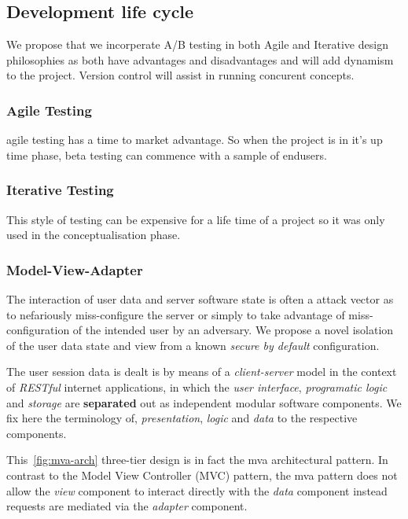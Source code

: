 \documentclass[letterpaper,12pt]{article}
\begin{document}
\subsection{Development life cycle}

We propose that we incorperate A/B testing in both Agile and Iterative design philosophies as both have advantages and disadvantages and will add dynamism to the project. Version control will assist in running concurent concepts. 

\subsubsection{Agile Testing}

\Gls{agile} testing has a time to market advantage. So when the project is in it's up time phase, beta testing can commence with a sample of endusers.

\subsubsection{Iterative Testing}

This style of testing can be expensive for a life time of a project so it was only used in the conceptualisation phase.

\subsubsection{Model-View-Adapter}

The interaction of user data and server software state is often a attack vector
as to nefariously miss-configure the server or simply to take advantage of
miss-configuration of the intended user by an adversary. We propose a novel
isolation of the user data state and view from a known \emph{secure by default}
configuration.

The user session data is dealt is by means of a \emph{client-server}
model in the context of \emph{RESTful} internet applications, in which
the \emph{user interface}, \emph{programatic logic}
and \emph{storage} are \textbf{separated} out as
independent modular software components. We fix here the terminology of,
\emph{presentation}, \emph{logic} and \emph{data} to the respective
components.



This~\cref{fig:mva-arch} three-tier design is in fact the \acrfull{mva} architectural pattern. In contrast to the Model View Controller (MVC)
pattern, the \acrshort{mva} pattern does not allow the \emph{view} component to interact
directly with the \emph{data} component instead requests are mediated via the
\emph{adapter} component.
\end{document}
